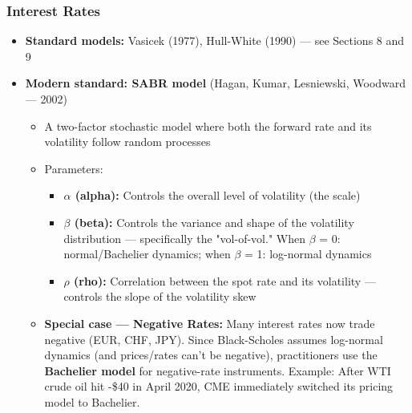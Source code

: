 \documentclass[12pt,openany]{book}
\theoremstyle{definition}
\theoremstyle{remark}
\begin{document}
\subsubsection{Interest Rates}
\begin{itemize}
\item \textbf{Standard models:} Vasicek (1977), Hull-White (1990) --- see Sections 8 and 9


\item \textbf{Modern standard: SABR model} (Hagan, Kumar, Lesniewski, Woodward --- 2002)

\begin{itemize}
\item A two-factor stochastic model where both the forward rate and its volatility follow random processes


\item Parameters:

\begin{itemize}
\item \textbf{\(\alpha\) (alpha):} Controls the overall level of volatility (the scale)


\item \textbf{\(\beta\) (beta):} Controls the variance and shape of the volatility distribution --- specifically the "vol-of-vol." When \(\beta\) = 0: normal/Bachelier dynamics; when \(\beta\) = 1: log-normal dynamics


\item \textbf{\(\rho\) (rho):} Correlation between the spot rate and its volatility --- controls the slope of the volatility skew


\end{itemize}

\item \textbf{Special case --- Negative Rates:} Many interest rates now trade negative (EUR, CHF, JPY). Since Black-Scholes assumes log-normal dynamics (and prices/rates can't be negative), practitioners use the \textbf{Bachelier model} for negative-rate instruments. Example: After WTI crude oil hit -\$40 in April 2020, CME immediately switched its pricing model to Bachelier.


\end{itemize}

\end{itemize}
\end{document}
